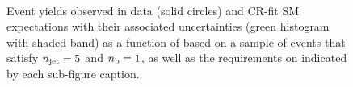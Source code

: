 \begin{figure}[h!]
\begin{center}
    \\
    \caption{Event yields observed in data (solid circles) and CR-fit SM expectations with their associated uncertainties (green histogram with shaded band) as a function of \HTmiss based on a sample of events that satisfy $n_{\text{jet}} = 5$ and $n_{\text{b}} = 1$, as well as the requirements on \scalht indicated by each sub-figure caption. }
    \label{fig:mhtval_eq5j_eq1b}
  \end{center}
\end{figure}

